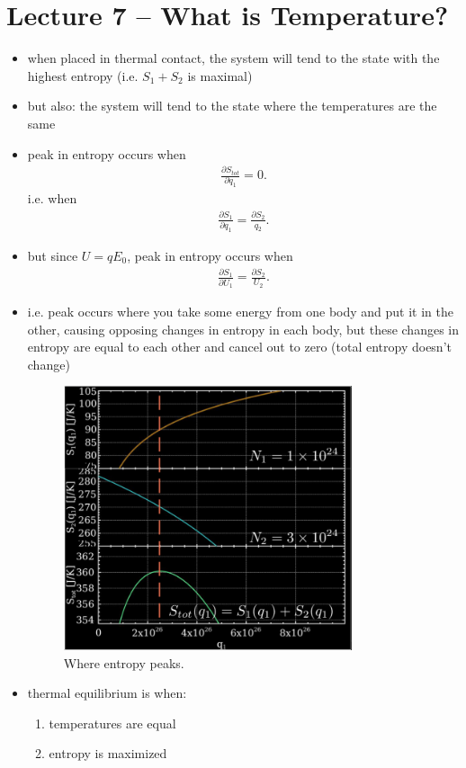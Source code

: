 \documentclass[10pt]{article}
\begin{document}
\section{Lecture 7 -- What is Temperature?}
\begin{itemize}
    \item when placed in thermal contact, the system will tend to the state with the highest entropy (i.e. $ S_1+S_2$ is maximal)
    \item but also: the system will tend to the state where the temperatures are the same
    \item peak in entropy occurs when
        \begin{gather*}
            \frac{\partial S_{tot}}{\partial q_1} = 0
        .\end{gather*}
        i.e. when 
        \begin{align*}
            \frac{\partial S_1}{\partial q_1} = \frac{\partial S_2}{q_2}
        .\end{align*}
    \item but since $U = qE_0$, peak in entropy occurs when
        \begin{align*}
            \frac{\partial S_1}{\partial U_1} = \frac{\partial S_2}{U_2}
        .\end{align*}
    \item i.e. peak occurs where you take some energy from one body and put it in the other, causing opposing changes in entropy in each body, but these changes in entropy are equal to each other and cancel out to zero (total entropy doesn't change)
        \begin{figure}[H]
            \centering
            \includegraphics[width=0.8\textwidth]{entropyPeak}
            \caption{Where entropy peaks.}
            \label{fig:entropyPeak}
        \end{figure}
    \item  thermal equilibrium is when:
        \begin{enumerate}
            \item temperatures are equal
            \item entropy is maximized
        \end{enumerate}
\end{itemize}
\end{document}
